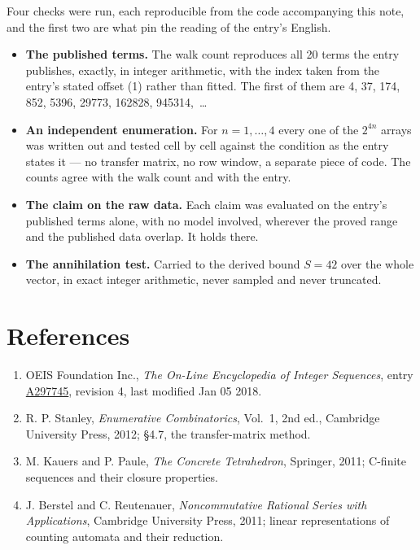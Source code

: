 \documentclass[11pt]{article}
\theoremstyle{definition}
\begin{document}
Four checks were run, each reproducible from the code accompanying this note, and the first two are what pin the reading of the entry's English.

\begin{itemize}

\item {\bfseries The published terms.} The walk count reproduces all 20 terms the entry publishes, exactly, in integer arithmetic, with the index taken from the entry's stated offset (1) rather than fitted. The first of them are 4, 37, 174, 852, 5396, 29773, 162828, 945314,~\dots

\item {\bfseries An independent enumeration.} For $n = 1,\dots,4$ every one of the $2^{4n}$ arrays was written out and tested cell by cell against the condition as the entry states it --- no transfer matrix, no row window, a separate piece of code. The counts agree with the walk count and with the entry.

\item {\bfseries The claim on the raw data.} Each claim was evaluated on the entry's published terms alone, with no model involved, wherever the proved range and the published data overlap. It holds there.

\item {\bfseries The annihilation test.} Carried to the derived bound $S = 42$ over the whole vector, in exact integer arithmetic, never sampled and never truncated.

\end{itemize}

\section{References}

\begin{enumerate}

\item OEIS Foundation Inc., \emph{The On-Line Encyclopedia of Integer Sequences}, entry \href{https://oeis.org/A297745}{A297745}, revision 4, last modified Jan 05 2018.

\item R. P. Stanley, \emph{Enumerative Combinatorics}, Vol.~1, 2nd ed., Cambridge University Press, 2012; \S4.7, the transfer-matrix method.

\item M. Kauers and P. Paule, \emph{The Concrete Tetrahedron}, Springer, 2011; C-finite sequences and their closure properties.

\item J. Berstel and C. Reutenauer, \emph{Noncommutative Rational Series with Applications}, Cambridge University Press, 2011; linear representations of counting automata and their reduction.

\end{enumerate}
\end{document}
